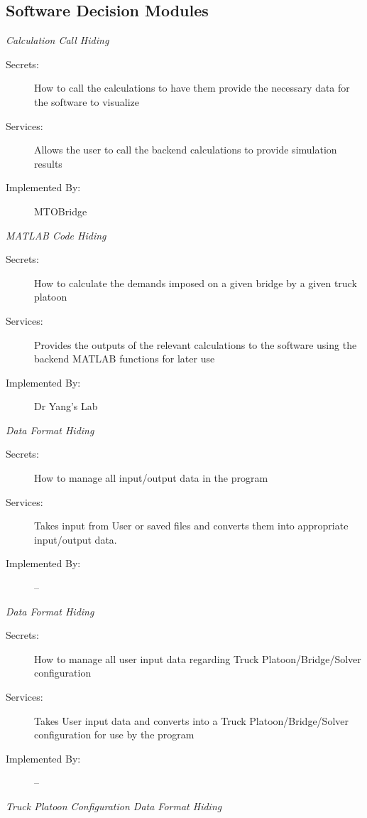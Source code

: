 \documentclass[12pt, titlepage]{article}
\begin{document}
\subsection{Software Decision Modules}
    \emph{{\large Calculation Call Hiding}}
    \begin{description}
        \item[Secrets:] How to call the calculations to have them provide the necessary data for the software to visualize
        \item[Services:] Allows the user to call the backend calculations to provide simulation results
        \item[Implemented By:] MTOBridge\\
    \end{description}
    \emph{{\large MATLAB Code Hiding}}
    \begin{description}
        \item[Secrets:] How to calculate the demands imposed on a given bridge by a given truck platoon
        \item[Services:] Provides the outputs of the relevant calculations to the software using the backend MATLAB functions for later use
        \item[Implemented By:] Dr Yang's Lab\\
    \end{description}
    \emph{{\large Data Format Hiding}}
    \begin{description}
        \item[Secrets:]How to manage all input/output data in the program
        \item[Services:]Takes input from User or saved files and converts them into appropriate input/output data.
        \item[Implemented By:] --\\
    \end{description}
    \emph{{\large Data Format Hiding}}
    \begin{description}
        \item[Secrets:]How to manage all user input data regarding Truck Platoon/Bridge/Solver configuration
        \item[Services:]Takes User input data and converts into a Truck Platoon/Bridge/Solver configuration for use by the program
        \item[Implemented By:] --\\
    \end{description}
    \emph{{\large Truck Platoon Configuration Data Format Hiding}}
\end{document}
